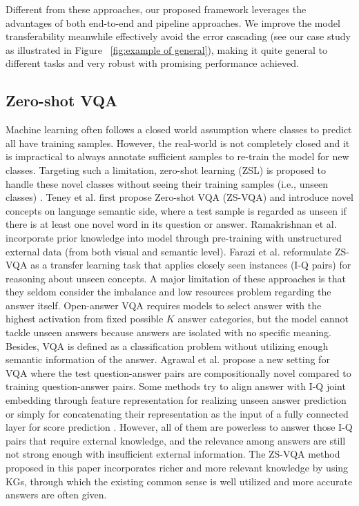 \documentclass[runningheads]{llncs}
\newcommand{\cjy}[1]{{\color{black}#1}}
\begin{document}
Different from these approaches, our proposed framework leverages \cjy{the advantages of both end-to-end and pipeline approaches}. We improve the model transferability meanwhile \cjy{effectively avoid} the error cascading (see our case study as illustrated in Figure~ \ref{fig:example of general}), \cjy{making it quite general to different tasks and very robust with promising performance achieved.}
\subsection{Zero-shot VQA}\label{tab:Zero-shot VQA}
Machine learning often follows a closed world assumption \cjy{where classes to predict all have training samples.}
 However, the real-world is not completely closed and it is impractical to always annotate sufficient samples to re-train the model for new classes. Targeting such a limitation, zero-shot learning (ZSL) is proposed to handle these novel classes without seeing their training samples (i.e., unseen classes) \cite{DBLP:conf/www/GengC0PYYJC21,chen2021knowledge}.
Teney et al. \cite{DBLP:journals/corr/TeneyH16a} first propose Zero-shot VQA (ZS-VQA) and introduce novel concepts on language semantic side, where a test sample is regarded as unseen if there is at least one novel word in its question or answer. 
Ramakrishnan et al. \cite{DBLP:conf/cvpr/RamakrishnanPSM17} incorporate prior knowledge into model through pre-training with unstructured external data (from both visual and semantic level). 
Farazi et al. \cite{DBLP:journals/ivc/FaraziKB20} 
reformulate ZS-VQA as a transfer learning task that applies closely seen instances (I-Q pairs) for reasoning about unseen concepts. 
A major limitation of these approaches is that they seldom consider the imbalance and low resources problem regarding the answer itself.
Open-answer VQA requires  models to select answer with the highest activation from fixed possible $K$ answer categories, but the model cannot tackle unseen answers because answers are isolated with no specific meaning. Besides, VQA is defined as a classification problem without utilizing enough semantic information of the answer.
Agrawal et al. \cite{DBLP:journals/corr/AgrawalKBP17} propose a new setting for VQA where the test question-answer pairs are compositionally novel compared to training question-answer pairs.
Some methods \cite{DBLP:conf/cvpr/HuCS18,DBLP:journals/corr/abs-2005-01239} try to align answer with I-Q joint embedding through feature representation for realizing unseen answer prediction or simply for concatenating their representation as the input of a fully connected layer for score prediction \cite{DBLP:journals/corr/TeneyH16a}. 
However, all of them are powerless to answer those I-Q pairs that require external knowledge, and the relevance among answers are still not strong enough with insufficient external information. 
\cjy{The ZS-VQA method proposed in this paper incorporates richer and more relevant knowledge by using KGs, through which the existing common sense is well utilized and more accurate answers are often given.}
\end{document}
